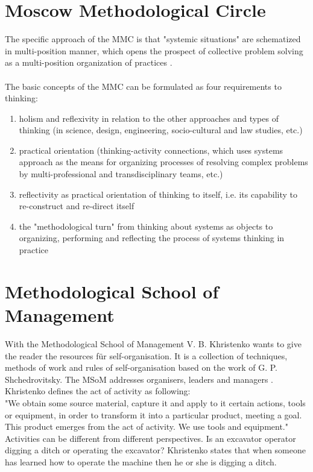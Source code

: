 \documentclass[11pt]{article}
\begin{document}
\section{ Moscow Methodological Circle }
The specific approach of the MMC is that "systemic situations" are schematized in multi-position manner, which opens the prospect of collective problem solving as a multi-position organization of practices \cite[p. 270]{3}.
\\ \\
\noindent The basic concepts of the MMC can be formulated as four requirements to thinking:
\begin{enumerate}
	\item holism and reflexivity in relation to the other approaches and types of thinking (in science, design, engineering, socio-cultural and law studies, etc.)
	\item practical orientation (thinking-activity connections, which uses systems approach as the means for organizing processes of resolving complex problems by multi-professional and transdisciplinary teams, etc.)
	\item reflectivity as practical orientation of thinking to itself, i.e.  its capability to re-construct and re-direct itself
	\item the "methodological turn" from thinking about systems as objects to organizing, performing and reflecting the process of systems thinking in practice
\end{enumerate}
 

\section{Methodological School of Management}
With the Methodological School of Management V. B. Khristenko wants to give the reader the resources für self-organisation. It is a collection of techniques, methods of work and rules of self-organisation based on the work of G. P. Shchedrovitsky. The MSoM addresses organisers, leaders and managers \cite[p. 36]{5}. \\ 

\noindent Khristenko defines the act of activity as following: \\
"We obtain some source material, capture it and apply to it certain actions, tools or equipment, in order to transform it into a particular product, meeting a goal. This product emerges from the act of activity. We use tools and equipment." \cite[p. 36]{5} \\
Activities can be different from different perspectives. Is an excavator operator digging a ditch or operating the excavator? Khristenko states that when someone has learned how to operate the machine then he or she is digging a ditch. \\
\end{document}
